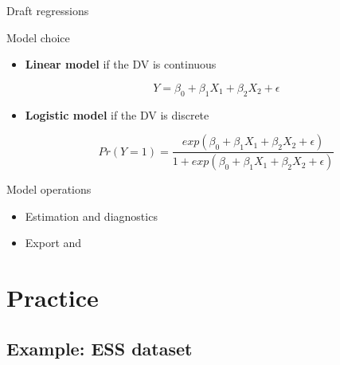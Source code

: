 \documentclass[t]{beamer}
\begin{document}
  \begin{frame}[c]{Draft regressions}
  
	\begin{block}{Model choice}
	
		\begin{itemize}
			\item \textbf{Linear model} if the DV is continuous \hfill %
				
				$$Y = \beta_0 + \beta_1 X_1 + \beta_2 X_2 + \epsilon$$
				
			\item \textbf{Logistic model} if the DV is discrete \hfill %
				
				$$Pr(Y = 1) = \frac{exp(\beta_0 + \beta_1 X_1 + \beta_2 X_2 + \epsilon)}%
				{1 + exp(\beta_0 + \beta_1 X_1 + \beta_2 X_2 + \epsilon)}$$
				
		\end{itemize}

	\end{block}

	\begin{block}{Model operations}

		\begin{itemize}
			\item Estimation and diagnostics
			\item Export and 
		\end{itemize}
		
	\end{block}
	
  \end{frame}

	\section{Practice}

	\subsection{Example: ESS dataset}
	
\end{document}
